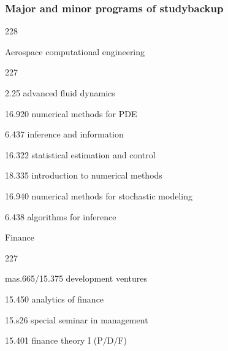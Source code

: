 \documentclass{beamer}
\newcommand{\barrow}{\item[\color{darkred}\ding{228}]}
\newcommand{\carrow}{\item[\color{darkred}\ding{227}]}
\begin{document}
\begin{frame}
    \frametitle{Major and minor programs of study\hfill \scriptsize{backup}}\small
    \begin{dinglist}{228}
        \barrow Aerospace computational engineering\scriptsize
                \begin{dinglist}{227}
                    \carrow 2.25 advanced fluid dynamics
                    \carrow 16.920 numerical methods for PDE
                    \carrow 6.437 inference and information
                    \carrow 16.322 statistical estimation and control
                    \carrow 18.335 introduction to numerical methods
                    \carrow 16.940 numerical methods for stochastic modeling
                    \carrow 6.438 algorithms for inference
                \end{dinglist}
        \small
        \barrow Finance\scriptsize
                \begin{dinglist}{227}
                    \carrow mas.665/15.375 development ventures
                    \carrow 15.450 analytics of finance
                    \carrow 15.s26 special seminar in management
                    \carrow 15.401 finance theory I (P/D/F)
                \end{dinglist}
    \end{dinglist}
\end{frame}
\end{document}
